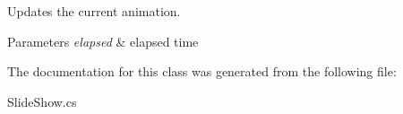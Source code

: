 Updates the current animation. 


\begin{DoxyParams}{Parameters}
{\em elapsed} & elapsed time \\
\hline
\end{DoxyParams}


The documentation for this class was generated from the following file\-:\begin{DoxyCompactItemize}
\item 
Slide\-Show.\-cs\end{DoxyCompactItemize}
